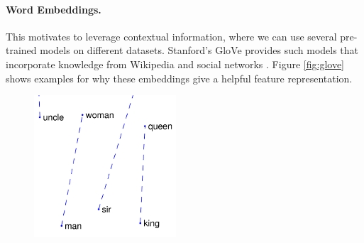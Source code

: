 \paragraph{Word Embeddings.} This motivates to leverage contextual information, where we can use several pre-trained models on different datasets. Stanford's GloVe provides such models that incorporate knowledge from Wikipedia and social networks \cite{pennington2014glove}. Figure \ref{fig:glove} shows examples for why these embeddings give a helpful feature representation. 

\begin{figure}[h]
\centering
\begin{minipage}{.3\textwidth}
  \centering
  \includegraphics[width=\linewidth]{images/glove_mw}
\end{minipage}
\begin{minipage}{.3\textwidth}
  \centering

\end{minipage}
\end{figure}
